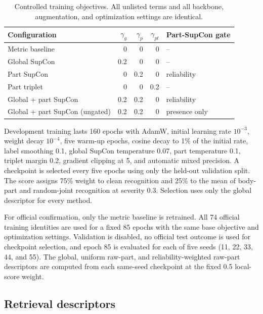 \documentclass[runningheads]{llncs}
\begin{document}
\begin{table}[t]
\centering
\caption{Controlled training objectives. All unlisted terms and all backbone,
augmentation, and optimization settings are identical.}
\label{tab:objectives}
\small
\begin{tabular}{lrrrl}
\toprule
Configuration & $\gamma_g$ & $\gamma_p$ & $\gamma_{pt}$ & Part-SupCon gate \\
\midrule
Metric baseline & 0 & 0 & 0 & -- \\
Global SupCon & 0.2 & 0 & 0 & -- \\
Part SupCon & 0 & 0.2 & 0 & reliability \\
Part triplet & 0 & 0 & 0.2 & -- \\
Global + part SupCon & 0.2 & 0.2 & 0 & reliability \\
Global + part SupCon (ungated) & 0.2 & 0.2 & 0 & presence only \\
\bottomrule
\end{tabular}
\end{table}

Development training lasts 160 epochs with AdamW, initial learning rate $10^{-3}$, weight
decay $10^{-4}$, five warm-up epochs, cosine decay to 1\% of the initial rate,
label smoothing 0.1, global SupCon temperature 0.07, part temperature 0.1,
triplet margin 0.2, gradient clipping at 5, and automatic mixed precision. A
checkpoint is selected every five epochs using only the held-out validation
split. The score assigns 75\% weight to clean recognition and 25\% to the mean
of body-part and random-joint recognition at severity 0.3. Selection uses only
the global descriptor for every method.

For official confirmation, only the metric baseline is retrained. All 74
official training identities are used for a fixed 85 epochs with the same base
objective and optimization settings. Validation is disabled, no official test
outcome is used for checkpoint selection, and epoch 85 is evaluated for each of
five seeds (11, 22, 33, 44, and 55). The global, uniform raw-part, and
reliability-weighted raw-part descriptors are computed from each same-seed
checkpoint at the fixed 0.5 local-score weight.

\subsection{Retrieval descriptors}
\end{document}
